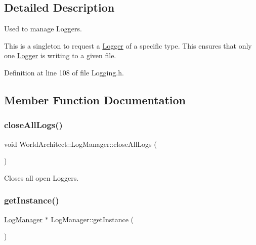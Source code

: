 \subsection{Detailed Description}
Used to manage Loggers. 

This is a singleton to request a \mbox{\hyperlink{class_world_architect_1_1_logger}{Logger}} of a specific type. This ensures that only one \mbox{\hyperlink{class_world_architect_1_1_logger}{Logger}} is writing to a given file. 

Definition at line 108 of file Logging.\+h.



\subsection{Member Function Documentation}
\mbox{\label{class_world_architect_1_1_log_manager_aa237d20cfb9e2843bd0f13d70dd5e7f3}} 
\subsubsection{\texorpdfstring{closeAllLogs()}{closeAllLogs()}}
{\footnotesize\ttfamily void World\+Architect\+::\+Log\+Manager\+::close\+All\+Logs (\begin{DoxyParamCaption}{ }\end{DoxyParamCaption})}



Closes all open Loggers. 

\mbox{\label{class_world_architect_1_1_log_manager_adc7504f084d4cc05071328651efcb272}} 
\subsubsection{\texorpdfstring{getInstance()}{getInstance()}}
{\footnotesize\ttfamily \mbox{\hyperlink{class_world_architect_1_1_log_manager}{Log\+Manager}} $\ast$ Log\+Manager\+::get\+Instance (\begin{DoxyParamCaption}{ }\end{DoxyParamCaption})\hspace{0.3cm}{\ttfamily [static]}}



